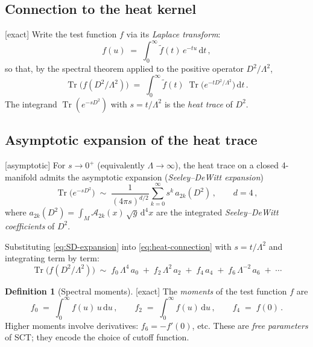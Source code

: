 \documentclass[12pt,a4paper]{article}
\theoremstyle{definition}
\newtheorem{definition}[proposition]{Definition}
\theoremstyle{remark}
\newcommand{\Tr}{\operatorname{Tr}}
\newcommand{\dd}{\mathrm{d}}
\newcommand{\exact}{\textcolor{blue!70!black}{\textsf{[exact]}}}
\newcommand{\approxstep}{\textcolor{orange!80!black}{\textsf{[asymptotic]}}}
\begin{document}
\subsection{Connection to the heat kernel}

\exact\;
Write the test function $f$ via its \emph{Laplace transform}:
\begin{equation}
  f(u) \;=\; \int_0^\infty \tilde{f}(t)\, e^{-tu}\,\dd t\,,
  \label{eq:laplace}
\end{equation}
so that, by the spectral theorem applied to the positive operator
$D^2/\Lambda^2$,
\begin{equation}
  \Tr\!\bigl(f(D^2/\Lambda^2)\bigr)
  \;=\;
  \int_0^\infty \tilde{f}(t)\;
  \Tr\!\bigl(e^{-t D^2/\Lambda^2}\bigr)\,\dd t\,.
  \label{eq:heat-connection}
\end{equation}
The integrand $\Tr(e^{-sD^2})$ with $s=t/\Lambda^2$ is the
\emph{heat trace} of $D^2$.

\subsection{Asymptotic expansion of the heat trace}

\approxstep\;
For $s\to 0^+$ (equivalently $\Lambda\to\infty$), the heat trace on a
closed 4-manifold admits the asymptotic expansion (\emph{Seeley--DeWitt
expansion})
\begin{equation}
  \Tr\!\bigl(e^{-s D^2}\bigr)
  \;\sim\;
  \frac{1}{(4\pi s)^{d/2}}
  \sum_{k=0}^{\infty} s^{k}\, a_{2k}(D^2)\,,
  \qquad d=4\,,
  \label{eq:SD-expansion}
\end{equation}
where $a_{2k}(D^2) = \int_M \mathcal{A}_{2k}(x)\,\sqrt{g}\,\dd^4 x$
are the integrated \emph{Seeley--DeWitt coefficients} of $D^2$.

Substituting \eqref{eq:SD-expansion} into \eqref{eq:heat-connection}
with $s=t/\Lambda^2$ and integrating term by term:
\begin{equation}
  \boxed{
  \Tr\!\bigl(f(D^2/\Lambda^2)\bigr)
  \;\sim\;
  f_0\,\Lambda^4\, a_0
  \;+\; f_2\,\Lambda^2\, a_2
  \;+\; f_4\, a_4
  \;+\; f_6\,\Lambda^{-2}\, a_6
  \;+\; \cdots
  }
  \label{eq:spectral-expansion}
\end{equation}

\begin{definition}[Spectral moments]
\exact\;
The \emph{moments} of the test function $f$ are
\begin{equation}
  f_0 \;=\; \int_0^\infty f(u)\, u\,\dd u\,,
  \qquad
  f_2 \;=\; \int_0^\infty f(u)\,\dd u\,,
  \qquad
  f_4 \;=\; f(0)\,.
  \label{eq:moments}
\end{equation}
Higher moments involve derivatives: $f_6 = -f'(0)$, etc.
These are \emph{free parameters} of SCT; they encode the choice of
cutoff function.
\end{definition}
\end{document}
